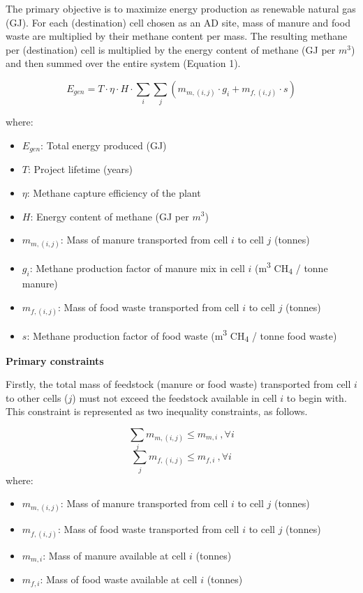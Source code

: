 \documentclass[12pt]{article}
\begin{document}
The primary objective is to maximize energy production as renewable natural gas (GJ). For each (destination) cell chosen as an AD site, mass of manure and food waste are multiplied by their methane content per mass. The resulting methane per (destination) cell is multiplied by the energy content of methane (GJ per $m^3$) and then summed over the entire system (Equation 1).

\begin{equation}
  E_{gen} = T \cdot \eta \cdot H \cdot \sum_{i}\sum_{j}(m_{m, (i, j)} \cdot g_i + m_{f, (i, j)} \cdot s)
\end{equation}

where:
\begin{itemize}
  \item $E_{gen}$: Total energy produced (GJ)
  \item $T$: Project lifetime (years)
  \item $\eta$: Methane capture efficiency of the plant
  \item $H$: Energy content of methane (GJ per $m^3$)
  \item $m_{m, (i, j)}$: Mass of manure transported from cell $i$ to cell $j$ (tonnes)
  \item $g_i$: Methane production factor of manure mix in cell $i$ (m\textsuperscript{3} CH\textsubscript{4} / tonne manure)
  \item $m_{f, (i, j)}$: Mass of food waste transported from cell $i$ to cell $j$ (tonnes)
  \item $s$: Methane production factor of food waste (m\textsuperscript{3} CH\textsubscript{4} / tonne food waste)
\end{itemize}

\vspace{10pt}
\textbf{Primary constraints}

Firstly, the total mass of feedstock (manure or food waste) transported from cell $i$ to other cells ($j$) must not exceed the feedstock available in cell $i$ to begin with. This constraint is represented as two inequality constraints, as follows.

\begin{equation}
  \sum_{j} m_{m, (i,j)} \leq m_{m, i} \ , \forall i
\end{equation}
\begin{equation}
  \sum_{j} m_{f, (i,j)} \leq m_{f, i} \ , \forall i
\end{equation}
where:
\begin{itemize}
  \item $m_{m, (i,j)}$: Mass of manure transported from cell $i$ to cell $j$ (tonnes)
  \item $m_{f, (i,j)}$: Mass of food waste transported from cell $i$ to cell $j$ (tonnes)
  \item $m_{m, i}$: Mass of manure available at cell $i$ (tonnes)
  \item $m_{f, i}$: Mass of food waste available at cell $i$ (tonnes)
\end{itemize}
\end{document}
